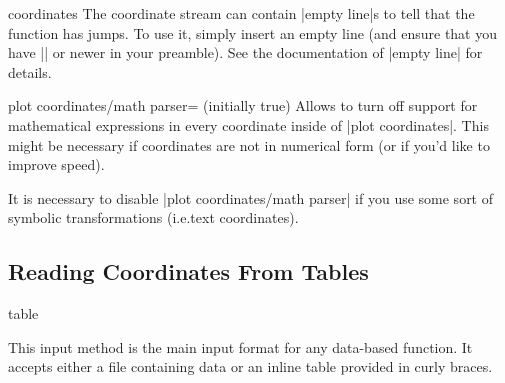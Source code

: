 {\begin{addplotoperation}[]{coordinates}{}
The coordinate stream can contain |empty line|s to tell \PGFPlots{} that the
function has jumps. To use it, simply insert an empty line (and ensure that you
have |\pgfplotsset{compat=1.4}| or newer in your preamble). See the
documentation of |empty line| for details.
\end{addplotoperation}

\begin{pgfplotskey}{plot coordinates/math parser= (initially true)}
    Allows to turn off support for mathematical expressions in every coordinate
    inside of |plot coordinates|. This might be necessary if coordinates are
    not in numerical form (or if you'd like to improve speed).

    It is necessary to disable |plot coordinates/math parser| if you use some
    sort of symbolic transformations (i.e.\@ text coordinates).
\end{pgfplotskey}


\subsection{Reading Coordinates From Tables}

\begin{addplotoperation}[]{table}{}
\label{pgfplots:addplot:table}

This input method is the main input format for any data-based function. It
accepts either a file containing data or an inline table provided in curly
braces.


\end{addplotoperation}}
